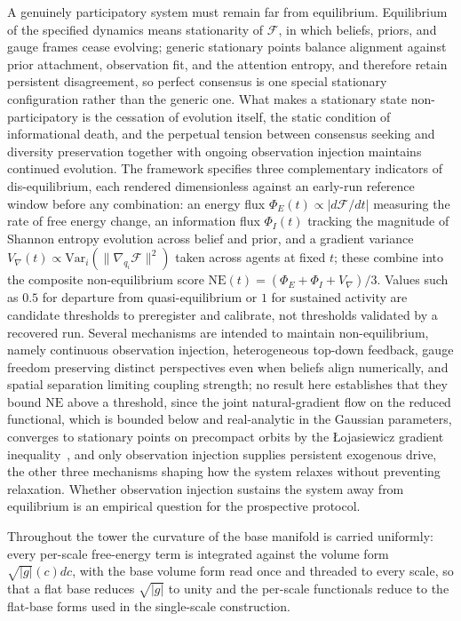 \documentclass[11pt]{article}
\begin{document}
A genuinely participatory system must remain far from equilibrium. Equilibrium of the specified dynamics means stationarity of $\mathcal{F}$, in which beliefs, priors, and gauge frames cease evolving; generic stationary points balance alignment against prior attachment, observation fit, and the attention entropy, and therefore retain persistent disagreement, so perfect consensus is one special stationary configuration rather than the generic one. What makes a stationary state non-participatory is the cessation of evolution itself, the static condition of informational death, and the perpetual tension between consensus seeking and diversity preservation together with ongoing observation injection maintains continued evolution. The framework specifies three complementary indicators of dis-equilibrium, each rendered dimensionless against an early-run reference window before any combination: an energy flux $\Phi_E(t) \propto |d\mathcal{F}/dt|$ measuring the rate of free energy change, an information flux $\Phi_I(t)$ tracking the magnitude of Shannon entropy evolution across belief and prior, and a gradient variance $V_{\nabla}(t) \propto \mathrm{Var}_{i}(\|\nabla_{q_i}\mathcal{F}\|^2)$ taken across agents at fixed $t$; these combine into the composite non-equilibrium score $\mathrm{NE}(t) = (\Phi_E + \Phi_I + V_{\nabla})/3$. Values such as $0.5$ for departure from quasi-equilibrium or $1$ for sustained activity are candidate thresholds to preregister and calibrate, not thresholds validated by a recovered run. Several mechanisms are intended to maintain non-equilibrium, namely continuous observation injection, heterogeneous top-down feedback, gauge freedom preserving distinct perspectives even when beliefs align numerically, and spatial separation limiting coupling strength; no result here establishes that they bound $\mathrm{NE}$ above a threshold, since the joint natural-gradient flow on the reduced functional, which is bounded below and real-analytic in the Gaussian parameters, converges to stationary points on precompact orbits by the {\L}ojasiewicz gradient inequality~\cite{absil2005convergence}, and only observation injection supplies persistent exogenous drive, the other three mechanisms shaping how the system relaxes without preventing relaxation. Whether observation injection sustains the system away from equilibrium is an empirical question for the prospective protocol.

Throughout the tower the curvature of the base manifold is carried uniformly: every per-scale free-energy term is integrated against the volume form $\sqrt{|g|}(c) dc$, with the base volume form read once and threaded to every scale, so that a flat base reduces $\sqrt{|g|}$ to unity and the per-scale functionals reduce to the flat-base forms used in the single-scale construction.
\end{document}
